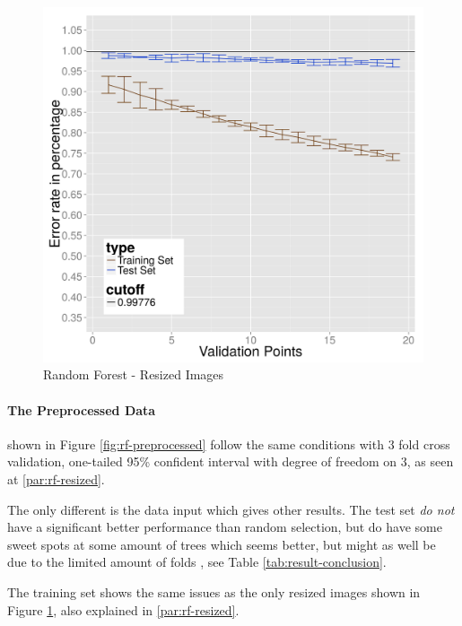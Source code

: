 \begin{figure}
  \centering
  \includegraphics[width=0.9\linewidth]{Images/DRFraw}
  \caption{Random Forest - Resized Images}
  \label{fig:rf-resized}
\end{figure}

\paragraph{The Preprocessed Data}
shown in Figure \ref{fig:rf-preprocessed} follow the same conditions with 3 fold cross validation, one-tailed 95\% confident interval with degree of freedom on 3, as seen at \ref{par:rf-resized}.

The only different is the data input which gives other results.
The test set \emph{do not} have a significant better performance than random selection, but do have some sweet spots at some amount of trees which seems better, but might as well be due to the limited amount of folds
, see Table \ref{tab:result-conclusion}.

The training set shows the same issues as the only resized images shown in Figure \ref{fig:rf-resized}, also explained in \ref{par:rf-resized}.


